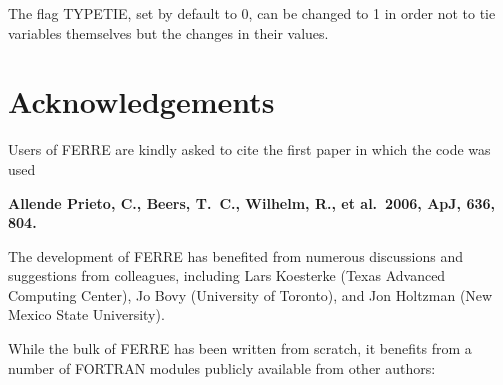 \documentclass[12pt]{article}
\begin{document}
The flag TYPETIE, set by default to 0, can be changed to 1 in order not to
tie variables themselves but the changes in their values.
 
\section{Acknowledgements}

Users of FERRE are kindly asked to cite the first paper in which the code was used

{\bf Allende Prieto, C., Beers, T.~C., Wilhelm, R., et al.\ 2006, ApJ, 636, 804.}


\noindent The development of FERRE has benefited from numerous discussions and suggestions
from colleagues, including 
Lars Koesterke (Texas Advanced Computing Center), Jo Bovy (University of Toronto), and
Jon Holtzman (New Mexico State University).

\noindent While the bulk of FERRE has been written from scratch, it benefits from a number of FORTRAN
modules publicly available from other authors:
\end{document}
